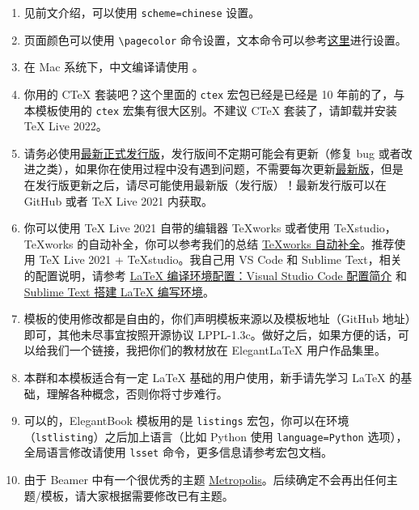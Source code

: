\documentclass[lang=cn,10pt,cite=super]{elegantbook}
\begin{document}
\begin{enumerate}[itemsep=1.5ex]
  \item {}
    见前文介绍，可以使用 \lstinline{scheme=chinese} 设置。
  \item {}
    页面颜色可以使用 \lstinline{\pagecolor} 命令设置，文本命令可以参考\href{https://tex.stackexchange.com/questions/278544/xcolor-what-is-the-equivalent-of-default-text-color}{这里}进行设置。
  \item {}
    在 Mac 系统下，中文编译请使用 。
  \item {}
    你用的 C\TeX{} 套装吧？这个里面的 \lstinline{ctex} 宏包已经是已经是 10 年前的了，与本模板使用的 \lstinline{ctex} 宏集有很大区别。不建议 C\TeX{} 套装了，请卸载并安装 \TeX{} Live 2022。
  \item {}
    请务必使用\href{https://github.com/ElegantLaTeX/ElegantBook/releases}{最新正式发行版}，发行版间不定期可能会有更新（修复 bug 或者改进之类），如果你在使用过程中没有遇到问题，不需要每次更新\href{https://github.com/ElegantLaTeX/ElegantBook/archive/master.zip}{最新版}，但是在发行版更新之后，请尽可能使用最新版（发行版）！最新发行版可以在 GitHub 或者 \TeX{} Live 2021 内获取。
  \item {}
    你可以使用 \TeX{} Live 2021 自带的编辑器 \TeX{}works 或者使用 \TeX{}studio，\TeX works 的自动补全，你可以参考我们的总结 \href{https://github.com/EthanDeng/texworks-autocomplete}{\TeX works 自动补全}。推荐使用 \TeX{} Live 2021 + \TeX{}studio。我自己用 VS Code 和 Sublime Text，相关的配置说明，请参考 \href{https://github.com/EthanDeng/vscode-latex}{\LaTeX{} 编译环境配置：Visual Studio Code 配置简介} 和 \href{https://github.com/EthanDeng/sublime-text-latex}{Sublime Text 搭建 \LaTeX{} 编写环境}。
  \item {}
    模板的使用修改都是自由的，你们声明模板来源以及模板地址（GitHub 地址）即可，其他未尽事宜按照开源协议 LPPL-1.3c。做好之后，如果方便的话，可以给我们一个链接，我把你们的教材放在 Elegant\LaTeX{} 用户作品集里。
  \item {}
    本群和本模板适合有一定 \LaTeX{} 基础的用户使用，新手请先学习 \LaTeX{} 的基础，理解各种概念，否则你将寸步难行。
  \item {}
    可以的，ElegantBook 模板用的是 \lstinline{listings} 宏包，你可以在环境（\lstinline{lstlisting}）之后加上语言（比如 Python 使用 \lstinline{language=Python} 选项），全局语言修改请使用 \lstinline{lsset} 命令，更多信息请参考宏包文档。
  \item {}
    由于 Beamer 中有一个很优秀的主题 \href{https://github.com/matze/mtheme}{Metropolis}。后续确定不会再出任何主题/模板，请大家根据需要修改已有主题。
\end{enumerate}
\end{document}

